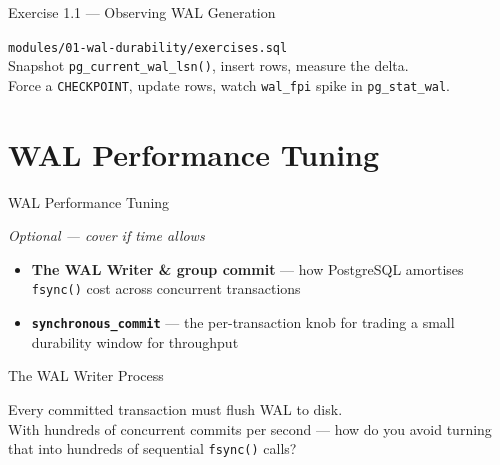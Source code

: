 \documentclass[aspectratio=169,10pt]{beamer}
\begin{document}
\begin{frame}{Exercise 1.1 --- Observing WAL Generation}

  \begin{block}{}
    \faTerminal\enspace\texttt{modules/01-wal-durability/exercises.sql}\\[0.5em]
    Snapshot \texttt{pg\_current\_wal\_lsn()}, insert rows, measure the
    delta.\\[0.3em]
    Force a \texttt{CHECKPOINT}, update rows, watch \texttt{wal\_fpi}
    spike in \texttt{pg\_stat\_wal}.
  \end{block}

\end{frame}

\section{WAL Performance Tuning}

\begin{frame}{WAL Performance Tuning}

  \begin{center}
    {\large \textit{Optional --- cover if time allows}}
  \end{center}

  \vspace{0.6em}
  \begin{itemize}
    \item \textbf{The WAL Writer \& group commit} --- how PostgreSQL
          amortises \texttt{fsync()} cost across concurrent transactions
    \item \textbf{\texttt{synchronous\_commit}} --- the per-transaction
          knob for trading a small durability window for throughput
  \end{itemize}

\end{frame}

\begin{frame}{The WAL Writer Process}

  \begin{block}{}
    Every committed transaction must flush WAL to disk.\\[0.4em]
    With hundreds of concurrent commits per second ---
    how do you avoid turning that into hundreds of sequential
    \texttt{fsync()} calls?
  \end{block}

\end{frame}
\end{document}
